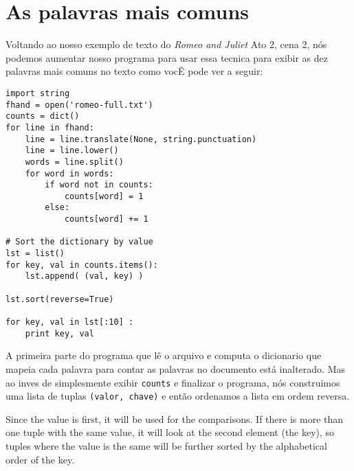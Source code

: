 \section{As palavras mais comuns}

Voltando ao nosso exemplo de texto do \emph{Romeo and Juliet}
Ato 2, cena 2, nós podemos aumentar nosso programa para usar essa tecnica
para exibir as dez palavras mais comuns no texto como vocÊ pode ver a seguir:

\beforeverb
\begin{verbatim}
import string
fhand = open('romeo-full.txt')
counts = dict()
for line in fhand:
    line = line.translate(None, string.punctuation)
    line = line.lower()
    words = line.split()
    for word in words:
        if word not in counts:
            counts[word] = 1
        else:
            counts[word] += 1

# Sort the dictionary by value
lst = list()
for key, val in counts.items():
    lst.append( (val, key) )

lst.sort(reverse=True)

for key, val in lst[:10] :
    print key, val
\end{verbatim}
\afterverb
%
A primeira parte do programa que lê o arquivo e computa o dicionario
que mapeia cada palavra para contar as palavras no documento está
inalterado. Mas ao inves de simplesmente exibir {\tt counts} e 
finalizar o programa, nós construimos uma lista de tuplas 
{\tt (valor, chave)} e então ordenamos a lista em ordem reversa.

Since the value is first, it will be used for the comparisons. 
If there is more than one tuple with the same value, it will look
at the second element (the key), so tuples where the value is the
same will be further sorted by the alphabetical order of the key.

